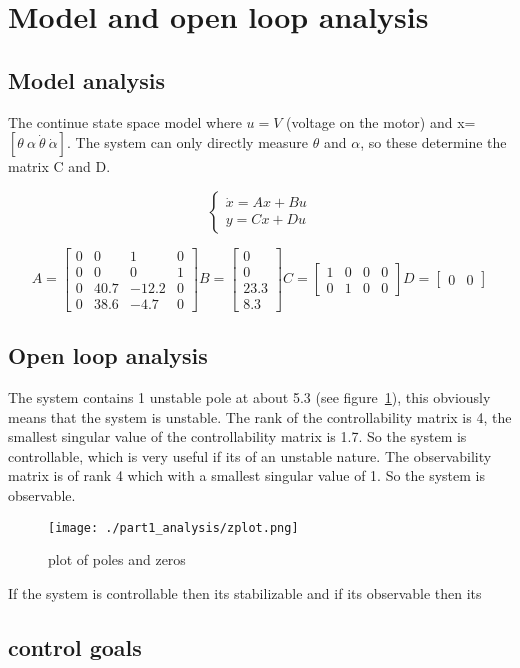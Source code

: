 \section{Model and open loop analysis}
\subsection{Model analysis}
The continue state space model where $u=V$ (voltage on the motor) and x=$[\theta \ \alpha \  \dot{\theta} \ \dot{\alpha} ]$. The system can only directly measure $\theta$ and $\alpha$, so these determine the matrix C and D.

$$
\begin{cases}
\dot{x}=Ax+Bu \\
y=Cx+Du
\end{cases}
$$

$$
A=
\begin{bmatrix}
0 & 0 & 1 & 0 \\
0 & 0 & 0 & 1 \\
0 & 40.7 & -12.2 & 0 \\
0 & 38.6 & -4.7 & 0 
\end{bmatrix}
B=
\begin{bmatrix}
0 \\
0 \\
23.3 \\
8.3
\end{bmatrix}
C=
\begin{bmatrix}
1 & 0 & 0 & 0\\
0 & 1 & 0 & 0
\end{bmatrix}
D=
\begin{bmatrix}
0 & 0
\end{bmatrix}
$$

\subsection{Open loop analysis}

The system contains 1 unstable pole at about 5.3 (see figure~\ref{fig:zplot system}), this obviously means that the system is unstable. The rank of the controllability matrix is 4, the smallest singular value of the controllability matrix is 1.7. So the system is controllable, which is very useful if its of an unstable nature. The observability matrix is of rank 4 which with a smallest singular value of 1. So the system is observable.

\begin{figure}[H]
	\centering
	\texttt{[image: ./part1\_analysis/zplot.png]}
	\caption{plot of poles and zeros}
	\label{fig:zplot system}
\end{figure}

If the system is controllable then its stabilizable and if its observable then its 

\subsection{control goals}